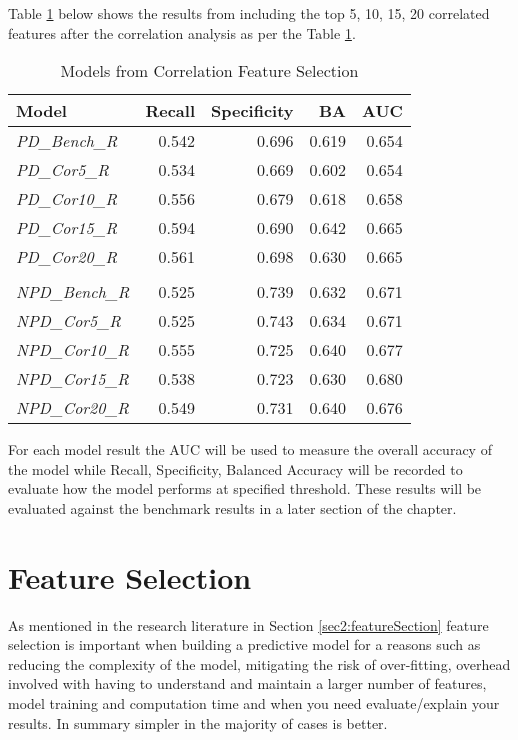 Table \ref{table:CorrModelResults} below shows the results from including the top 5, 10, 15, 20 correlated features after the correlation analysis as per the Table \ref{table:CorrModelResults}. 

\begin{table}[H]
\centering
\small
		\begin{tabular}{l r r r r}
			\hline
			\textbf{Model} & \textbf{Recall} & \textbf{Specificity} & \textbf{BA} & \textbf{AUC}  \\ \hline
			\textit{PD\_Bench\_R} & 0.542 & 0.696 & 0.619 & 0.654 \\ \hline
			\textit{PD\_Cor5\_R}  & 0.534 & 0.669 & 0.602 & 0.654   \\ 
			\textit{PD\_Cor10\_R} & 0.556 & 0.679 & 0.618 & 0.658  \\ 
			\textit{PD\_Cor15\_R} & 0.594 & 0.690 & 0.642 & 0.665  \\
			\textit{PD\_Cor20\_R} & 0.561 & 0.698 & 0.630 & 0.665  \\\hline 
			\\\hline
			\textit{NPD\_Bench\_R} & 0.525 & 0.739 & 0.632 & 0.671   \\ \hline
			\textit{NPD\_Cor5\_R}  & 0.525 & 0.743 & 0.634 & 0.671   \\ 
			\textit{NPD\_Cor10\_R} & 0.555 & 0.725 & 0.640 & 0.677  \\ 
			\textit{NPD\_Cor15\_R} & 0.538 & 0.723 & 0.630 & 0.680  \\
			\textit{NPD\_Cor20\_R} & 0.549 & 0.731 & 0.640 & 0.676  \\\hline 
		\end{tabular}
	\caption{Models from Correlation Feature Selection}
	\label{table:CorrModelResults}
\end{table}

For each model result the AUC will be used to measure the overall accuracy of the model while Recall, Specificity, Balanced Accuracy will be recorded to evaluate how the model performs at specified threshold. These results will be evaluated against the benchmark results in a later section of the chapter.


\section{Feature Selection}
As mentioned in the research literature in Section \ref{sec2:featureSection} feature selection is important when building a predictive model for a reasons such as reducing the complexity of the model, mitigating the risk of over-fitting, overhead involved with having to understand and maintain a larger number of features, model training and computation time and when you need evaluate/explain your results. In summary simpler in the majority of cases is better.

